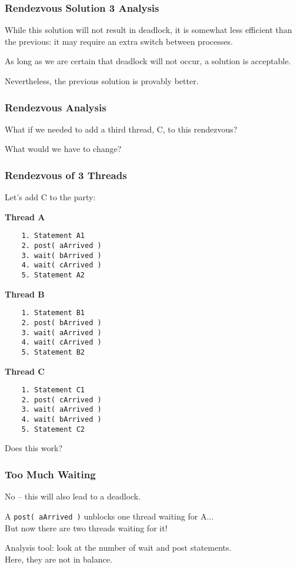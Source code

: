 \begin{frame}
	\frametitle{Rendezvous Solution 3 Analysis}

	While this solution will not result in deadlock, it is somewhat less efficient than the previous: it may require an extra switch between processes.

	As long as we are certain that deadlock will not occur, a solution is acceptable.

	Nevertheless, the previous solution is provably better.

\end{frame}


\begin{frame}
	\frametitle{Rendezvous Analysis}

	What if we needed to add a third thread, C, to this rendezvous?

	What would we have to change?


\end{frame}

\begin{frame}[fragile]
	\frametitle{Rendezvous of 3 Threads}

	Let's add C to the party:

	\begin{multicols}{3}
		\textbf{Thread A}
		\begin{verbatim}
	1. Statement A1
	2. post( aArrived )
	3. wait( bArrived )
	4. wait( cArrived )
	5. Statement A2
  \end{verbatim}
		\columnbreak
		\textbf{Thread B}
		\begin{verbatim}
	1. Statement B1
	2. post( bArrived )
	3. wait( aArrived )
	4. wait( cArrived )
	5. Statement B2
  \end{verbatim}
  		\columnbreak
		\textbf{Thread C}
		\begin{verbatim}
	1. Statement C1
	2. post( cArrived )
	3. wait( aArrived )
	4. wait( bArrived )
	5. Statement C2
  \end{verbatim}
	\end{multicols}
	\vspace{-2em}

Does this work?

\end{frame}


\begin{frame}
\frametitle{Too Much Waiting}

No -- this will also lead to a deadlock. 

A \texttt{post( aArrived )} unblocks one thread waiting for A...\\
\quad But now there are two threads waiting for it!


Analysis tool: look at the number of wait and post statements.\\
\quad Here, they are not in balance.

\end{frame}

